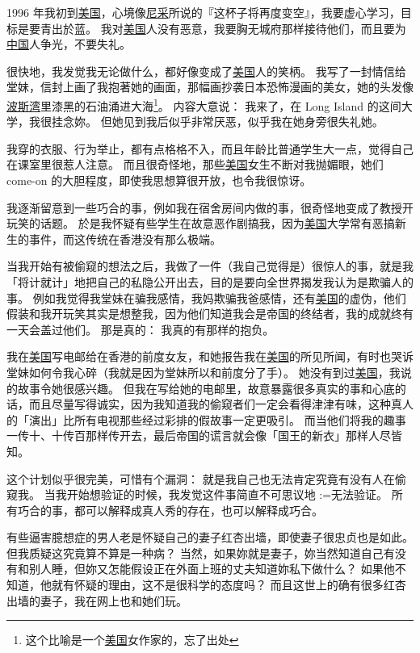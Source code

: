 \documentclass[12pt]{report}
\makeatletter
\renewcommand{\d}[1]{$\underaccent{\scalebox{0.5}{\textbullet}}{\textrm{#1}}$}
\newcommand{\ds}[1]{%
  \@tfor\next:=#1\do{\d{\next}}}
\makeatother
\begin{document}
1996 年我初到\underline{美国}，心境像\underline{尼采}所说的『这杯子将再度变空』，我要虚心学习，目标是要青出於蓝。 我对\underline{美国}人没有恶意，我要胸无城府那样接待他们，而且要为\underline{中国}人争光，不要失礼。

很快地，我发觉我无论做什么，都好像变成了\underline{美国}人的笑柄。 我写了一封情信给堂妹，信封上画了我抱著她的画面，那幅画抄袭日本恐怖漫画的美女，她的头发像\underline{波斯湾}里漆黑的石油涌进大海\footnote{这个比喻是一个\underline{美国}女作家的，忘了出处}。 内容大意说： 我来了，在 Long Island 的这间大学，我很挂念妳。 但她见到我后似乎非常厌恶，似乎我在她身旁很失礼她。

我穿的衣服、行为举止，都有点格格不入，而且年龄比普通学生大一点，觉得自己在课室里很惹人注意。 而且很奇怪地，那些\underline{美国}女生不断对我抛媚眼，她们 come-on 的大胆程度，即使我思想算很开放，也令我很惊讶。

我逐渐留意到一些巧合的事，例如我在宿舍房间内做的事，很奇怪地变成了教授开玩笑的话题。 於是我怀疑有些学生在故意恶作剧搞我，因为\underline{美国}大学常有恶搞新生的事件，而这传统在香港没有那么极端。

当我开始有被偷窥的想法之后，我做了一件（我自己觉得是）很惊人的事，就是我「将计就计」地把自己的私隐公开出去，目的是要向全世界揭发我认为是欺骗人的事。  例如我觉得我堂妹在骗我感情，我妈欺骗我爸感情，还有\underline{美国}的虚伪，他们假装和我开玩笑其实是想整我，因为他们知道我会是帝国的终结者，我的成就终有一天会盖过他们。 那是真的： 我真的有那样的抱负。

我在\underline{美国}写电邮给在香港的前度女友，和她报告我在\underline{美国}的所见所闻，有时也哭诉堂妹如何令我心碎（我就是因为堂妹所以和前度分了手）。  她没有到过\underline{美国}，我说的故事令她很感兴趣。  但我在写给她的电邮里，故意暴露很多真实的事和心底的话，而且尽量写得诚实，因为我知道我的偷窥者们一定会看得津津有味，这种真人的「演出」比所有电视那些经过彩排的假故事一定更吸引。  而当他们将我的趣事一传十、十传百那样传开去，最后帝国的谎言就会像「国王的新衣」那样人尽皆知。

这个计划似乎很完美，可惜有个漏洞： 就是我自己也无法肯定究竟有没有人在偷窥我。 当我开始想验证的时候，我发觉这件事简直不可思议地\ds{无法验证}。  所有巧合的事，都可以解释成真人秀的存在，也可以解释成巧合。

有些逼害臆想症的男人老是怀疑自己的妻子红杏出墙，即使妻子很忠贞也是如此。 但我质疑这究竟算不算是一种病？ 当然，如果妳就是妻子，妳当然知道自己有没有和别人睡，但妳又怎能假设正在外面上班的丈夫知道妳私下做什么？  如果他不知道，他就有怀疑的理由，这不是很科学的态度吗？  而且这世上的确有很多红杏出墙的妻子，我在网上也和她们玩。
\end{document}
